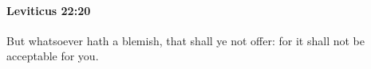 
		\paragraph{Leviticus 22:20} %
			\label{LEVITICUS-22-20}

			But whatsoever hath a blemish, that shall ye not offer: for it shall not be acceptable for you.


